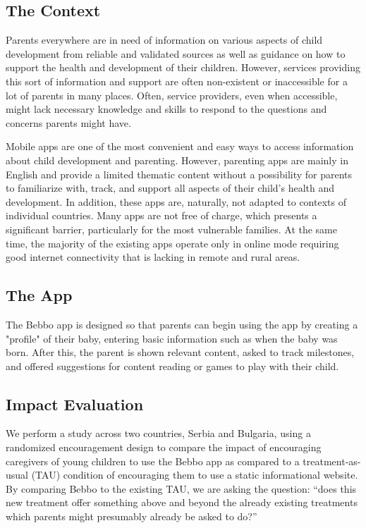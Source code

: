 \documentclass{article}
\begin{document}
\subsection*{The Context}
Parents everywhere are in need of information on various aspects of child development from reliable  and validated sources as well as guidance on how to support the health and development of their  children. However, services providing this sort of information and support are often non-existent or  inaccessible for a lot of parents in many places. Often, service providers, even when accessible, might  lack necessary knowledge and skills to respond to the questions and concerns parents might have.

Mobile apps are one of the most convenient and easy ways to access information about child  development and parenting. However, parenting apps are mainly in English and provide a limited  thematic content without a possibility for parents to familiarize with, track, and support all aspects of  their child’s health and development. In addition, these apps are, naturally, not adapted to contexts of  individual countries. Many apps are not free of charge, which presents a significant barrier, particularly  for the most vulnerable families. At the same time, the majority of the existing apps operate only in  online mode requiring good internet connectivity that is lacking in remote and rural areas.

\subsection*{The App}

The Bebbo app is designed so that parents can begin using the app by creating a "profile" of their baby, entering basic information such as when the baby was born. After this, the parent is shown relevant content, asked to track milestones, and offered suggestions for content reading or games to play with their child.

\subsection*{Impact Evaluation}

We perform a study across two countries, Serbia and Bulgaria, using a randomized encouragement design to compare the impact of encouraging caregivers of young children to use the Bebbo app as compared to a treatment-as-usual (TAU) condition of encouraging them to use a static informational website. By comparing Bebbo to the existing TAU, we are asking the question: “does this new treatment offer something above and beyond the already existing treatments which parents might presumably already be asked to do?”
\end{document}
